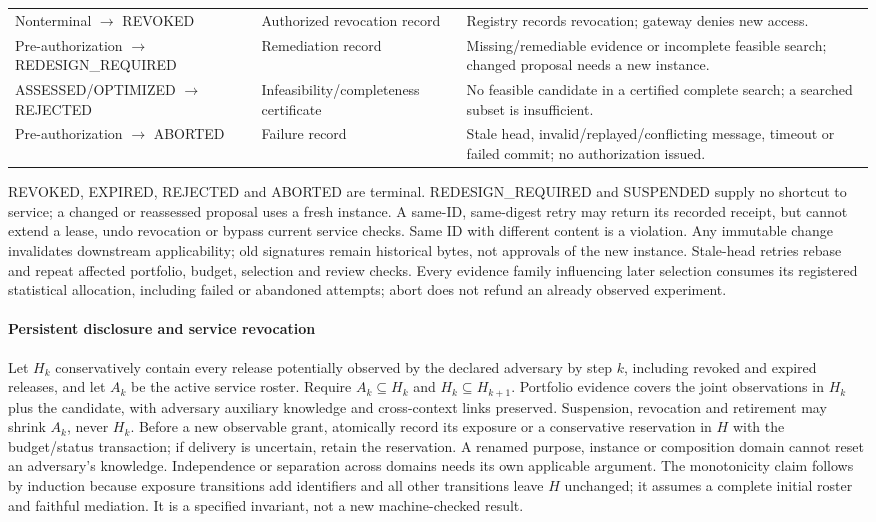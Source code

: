 \begin{table}[t]
\begin{tabular}{>{\raggedright\arraybackslash}p{}>{\raggedright\arraybackslash}p{}>{\raggedright\arraybackslash}p{}}
Nonterminal $\to$ REVOKED & Authorized revocation record & Registry records revocation; gateway denies new access. \\
Pre-authorization $\to$ REDESIGN\_REQUIRED & Remediation record & Missing/remediable evidence or incomplete feasible search; changed proposal needs a new instance. \\
ASSESSED/OPTIMIZED $\to$ REJECTED & Infeasibility/completeness certificate & No feasible candidate in a certified complete search; a searched subset is insufficient. \\
Pre-authorization $\to$ ABORTED & Failure record & Stale head, invalid/replayed/conflicting message, timeout or failed commit; no authorization issued. \\
\bottomrule
\end{tabular}
\end{table}

REVOKED, EXPIRED, REJECTED and ABORTED are terminal. REDESIGN\_REQUIRED and
SUSPENDED supply no shortcut to service; a changed or reassessed proposal
uses a fresh instance. A same-ID, same-digest retry may return its recorded
receipt, but cannot extend a lease, undo revocation or bypass current service
checks. Same ID with different content is a violation. Any immutable change
invalidates downstream applicability; old signatures remain historical bytes,
not approvals of the new instance. Stale-head retries rebase and repeat
affected portfolio, budget, selection and review checks. Every evidence
family influencing later selection consumes its registered statistical
allocation, including failed or abandoned attempts; abort does not refund
an already observed experiment.

\paragraph{Persistent disclosure and service revocation}
Let $H_k$ conservatively contain every release potentially observed by the
declared adversary by step $k$, including revoked and expired releases, and
let $A_k$ be the active service roster. Require $A_k\subseteq H_k$ and
$H_k\subseteq H_{k+1}$. Portfolio evidence covers the joint observations in
$H_k$ plus the candidate, with adversary auxiliary knowledge and cross-context
links preserved. Suspension, revocation and retirement may shrink $A_k$, never
$H_k$. Before a new observable grant, atomically record its exposure or a
conservative reservation in $H$ with the budget/status transaction; if delivery
is uncertain, retain the reservation. A renamed purpose, instance or composition
domain cannot reset an adversary's knowledge. Independence or separation across
domains needs its own applicable argument. The monotonicity claim follows by
induction because exposure transitions add identifiers and all other transitions
leave $H$ unchanged; it assumes a complete initial roster and faithful mediation.
It is a specified invariant, not a new machine-checked result.

